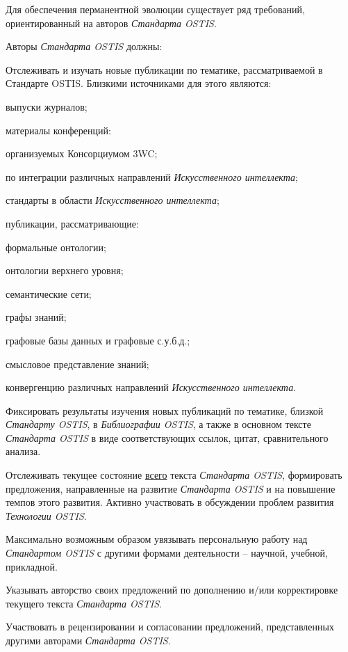 Для обеспечения перманентной эволюции существует ряд требований, ориентированный на авторов \textit{Стандарта OSTIS}. 

Авторы \textit{Стандарта OSTIS} должны:

\begin{textitemize}
	\item Отслеживать и изучать новые публикации по тематике, рассматриваемой в Стандарте OSTIS. Близкими источниками для этого являются:
	\begin{textitemize}
		\item выпуски журналов;
		\item материалы конференций:
		\begin{textitemize}
			\item организуемых Консорциумом 3WC;
			\item по интеграции различных направлений \textit{Искусственного интеллекта};
		\end{textitemize}
		\item стандарты в области \textit{Искусственного интеллекта};
		\item публикации, рассматривающие:
		\begin{textitemize}
			\item формальные онтологии;
			\item онтологии верхнего уровня;
			\item семантические сети;
			\item графы знаний;
			\item графовые базы данных и графовые с.у.б.д.;
			\item смысловое представление знаний;
			\item конвергенцию различных направлений \textit{Искусственного интеллекта}.
		\end{textitemize}
	\end{textitemize}
	\item Фиксировать результаты изучения новых публикаций по тематике, близкой \textit{Стандарту OSTIS}, в \textit{Библиографии OSTIS}, а также в основном тексте \textit{Стандарта OSTIS} в виде соответствующих ссылок, цитат, сравнительного анализа. 
	\item Отслеживать текущее состояние \uline{всего} текста \textit{Стандарта OSTIS}, формировать предложения, направленные на развитие \textit{Стандарта OSTIS} и на повышение темпов этого развития. Активно участвовать в обсуждении проблем развития \textit{Технологии OSTIS}.
	\item Максимально возможным образом увязывать персональную работу над \textit{Стандартом OSTIS} с другими формами деятельности -- научной, учебной, прикладной.
	\item Указывать авторство своих предложений по дополнению и/или корректировке текущего текста \textit{Стандарта OSTIS}.
	\item Участвовать в рецензировании и согласовании предложений, представленных другими авторами \textit{Стандарта OSTIS}.
\end{textitemize}

